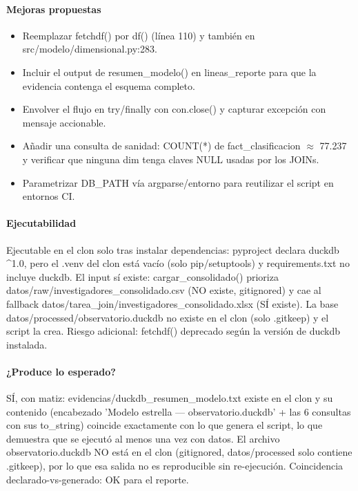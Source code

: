 \paragraph{Mejoras propuestas}
\begin{itemize}
  \item Reemplazar fetchdf() por df() (línea 110) y también en src/modelo/dimensional.py:283.
  \item Incluir el output de resumen\_modelo() en lineas\_reporte para que la evidencia contenga el esquema completo.
  \item Envolver el flujo en try/finally con con.close() y capturar excepción con mensaje accionable.
  \item Añadir una consulta de sanidad: COUNT(*) de fact\_clasificacion $\approx$ 77.237 y verificar que ninguna dim tenga claves NULL usadas por los JOINs.
  \item Parametrizar DB\_PATH vía argparse/entorno para reutilizar el script en entornos CI.
\end{itemize}

\paragraph{Ejecutabilidad}
Ejecutable en el clon solo tras instalar dependencias: pyproject declara duckdb \textasciicircum{}1.0, pero el .venv del clon está vacío (solo pip/setuptools) y requirements.txt no incluye duckdb. El input sí existe: cargar\_consolidado() prioriza datos/raw/investigadores\_consolidado.csv (NO existe, gitignored) y cae al fallback datos/tarea\_join/investigadores\_consolidado.xlsx (SÍ existe). La base datos/processed/observatorio.duckdb no existe en el clon (solo .gitkeep) y el script la crea. Riesgo adicional: fetchdf() deprecado según la versión de duckdb instalada.

\paragraph{¿Produce lo esperado?}
SÍ, con matiz: evidencias/duckdb\_resumen\_modelo.txt existe en el clon y su contenido (encabezado 'Modelo estrella --- observatorio.duckdb' + las 6 consultas con sus to\_string) coincide exactamente con lo que genera el script, lo que demuestra que se ejecutó al menos una vez con datos. El archivo observatorio.duckdb NO está en el clon (gitignored, datos/processed solo contiene .gitkeep), por lo que esa salida no es reproducible sin re-ejecución. Coincidencia declarado-vs-generado: OK para el reporte.

